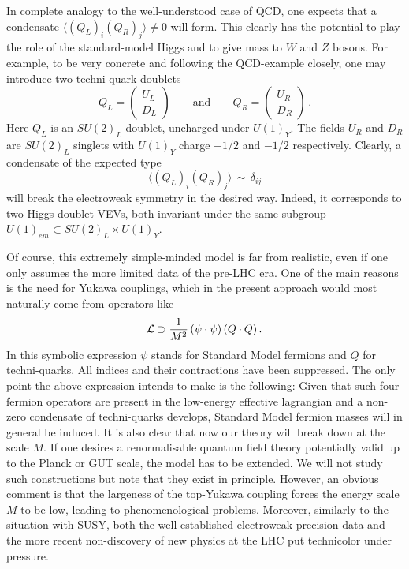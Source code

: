 \documentclass[12pt]{article}
\newcommand{\be}{\begin{equation}}
\newcommand{\ee}{\end{equation}}
\numberwithin{equation}{section}
\begin{document}
In complete analogy to the well-understood case of QCD, one expects that a condensate $\langle (Q_L)_i (Q_R)_j\rangle\neq 0$ will form. This clearly has the potential to play the role of the standard-model Higgs and to give mass to $W$ and $Z$ bosons. For example, to be very concrete and following the QCD-example closely, one may introduce two techni-quark doublets
\be
Q_L=\left(\begin{array}{c} U_L \\ D_L \end{array} \right) \qquad \mbox{and} \qquad 
Q_R=\left(\begin{array}{c} U_R \\ D_R \end{array} \right)\,.
\ee
Here $Q_L$ is an $SU(2)_L$ doublet, uncharged under $U(1)_Y$. The fields $U_R$ and $D_R$ are $SU(2)_L$ singlets with $U(1)_Y$ charge $+1/2$ and $-1/2$ respectively. Clearly, a condensate of the expected type
\be
\langle (Q_L)_i (Q_R)_j\rangle\,\sim\,\delta_{ij}
\ee
will break the electroweak symmetry in the desired way. Indeed, it corresponds to two Higgs-doublet VEVs, both invariant under the same subgroup $U(1)_{em}\subset SU(2)_L\times U(1)_Y$.

Of course, this extremely simple-minded model is far from realistic, even if one only assumes the more limited data of the pre-LHC era. One of the main reasons is the need for Yukawa couplings, which in the present approach would most naturally come from operators like
\be
{\cal L}\supset \frac{1}{M^2}\,(\psi\cdot\psi)\,(Q\cdot Q)\,.
\ee
In this symbolic expression $\psi$ stands for Standard Model fermions and $Q$ for techni-quarks. All indices and their contractions have been suppressed. The only point the above expression intends to make is the following: Given that such four-fermion operators are present in the low-energy effective lagrangian and a non-zero condensate of techni-quarks develops, Standard Model fermion masses will in general be induced. It is also clear that now our theory will break down at the scale $M$. If one desires a renormalisable quantum field theory potentially valid up to the Planck or GUT scale, the model has to be extended. We will not study such constructions but note that they exist in principle. However, an obvious comment is that the largeness  of the top-Yukawa coupling forces the energy scale $M$ to be low, leading to phenomenological problems. Moreover, similarly to the situation with SUSY, both the well-established electroweak precision data and the more recent non-discovery of new physics at the LHC put technicolor under pressure.
\end{document}
